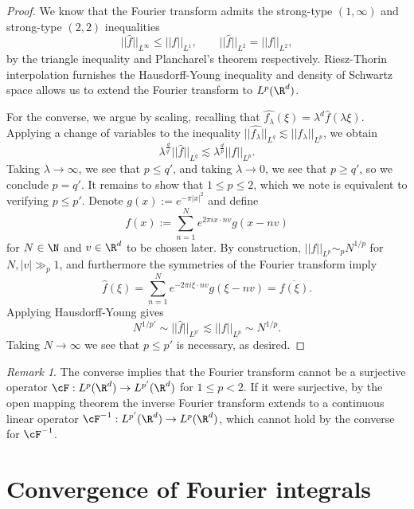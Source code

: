\documentclass[reqno]{amsart}
\theoremstyle{definition}
\theoremstyle{remark}
\newtheorem*{remark}{Remark}
\begin{document}
\begin{proof}
	We know that the Fourier transform admits the strong-type $(1, \infty)$ and strong-type $(2, 2)$ inequalities
		\[ ||\widehat f ||_{L^\infty} \leq ||f||_{L^1}, \qquad ||\widehat f||_{L^2} = ||f||_{L^2}, \]
	by the triangle inequality and Plancharel's theorem respectively. Riesz-Thorin interpolation furnishes the Hausdorff-Young inequality and density of Schwartz space allows us to extend the Fourier transform to $L^p (\R^d)$. 
	
	For the converse, we argue by scaling, recalling that $\widehat{f_\lambda} (\xi) = \lambda^d \widehat f (\lambda \xi)$. Applying a change of variables to the inequality $||\widehat{f_\lambda}||_{L^q} \lesssim ||f_\lambda||_{L^p}$, we obtain
		\[ \lambda^{\frac{d}{q'}} ||\widehat f||_{L^q}  \lesssim \lambda^{\frac{d}{p}} ||f||_{L^p}. \]
	Taking $\lambda \to \infty$, we see that $p \leq q'$, and taking $\lambda \to 0$, we see that $p \geq q'$, so we conclude $p = q'$. It remains to show that $1 \leq p \leq 2$, which we note is equivalent to verifying $p \leq p'$. Denote $g(x) := e^{-\pi |x|^2}$ and define
		\[ f(x) := \sum_{n = 1}^N e^{2\pi i x \cdot nv} g(x - n v) \]
	for $N \in \N$ and $v \in \R^d$ to be chosen later. By construction, $||f||_{L^p} \sim_p N^{1/p}$ for $N, |v| \gg_p 1$, and furthermore the symmetries of the Fourier transform imply
		\[ \widehat f(\xi) = \sum_{n = 1}^N e^{-2 \pi i \xi \cdot n v} g(\xi - nv) = \overline{f(\xi)}. \]
	Applying Hausdorff-Young gives
		\[ N^{1/p'} \sim ||\widehat f||_{L^{p'}} \lesssim ||f||_{L^p} \sim N^{1/p}. \]
	Taking $N \to \infty$ we see that $p \leq p'$ is necessary, as desired. 	
\end{proof}

\begin{remark}
	The converse implies that the Fourier transform cannot be a surjective operator $\cF : L^p (\R^d) \to L^{p'} (\R^d)$ for $1 \leq p < 2$. If it were surjective, by the open mapping theorem the inverse Fourier transform extends to a continuous linear operator $\cF^{-1} : L^{p'} (\R^d) \to L^p (\R^d)$, which cannot hold by the converse for $\cF^{-1}$. 
\end{remark}

\section{Convergence of Fourier integrals}
\end{document}
